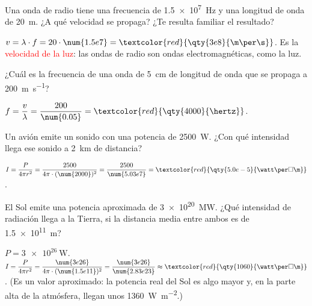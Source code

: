 \begin{exercise}
    Una onda de radio tiene una frecuencia de \qty{1.5e7}{\hertz} y una longitud de onda de \qty{20}{\m}. ¿A qué velocidad se propaga? ¿Te resulta familiar el resultado?
    \begin{solu}
        \(v = \lambda \cdot f = 20 \cdot \num{1.5e7} = \textcolor{red}{\qty{3e8}{\m\per\s}}\). Es la \textcolor{red}{velocidad de la luz}: las ondas de radio son ondas electromagnéticas, como la luz.
    \end{solu}
\end{exercise}

\begin{exercise}
    ¿Cuál es la frecuencia de una onda de \qty{5}{\cm} de longitud de onda que se propaga a \qty{200}{\m\per\s}?
    \begin{solu}
        \(f = \dfrac{v}{\lambda} = \dfrac{200}{\num{0.05}} = \textcolor{red}{\qty{4000}{\hertz}}\).
    \end{solu}
\end{exercise}

\begin{exercise}
    Un avión emite un sonido con una potencia de \qty{2500}{\watt}. ¿Con qué intensidad llega ese sonido a \qty{2}{\km} de distancia?
    \begin{solu}
        \(I = \dfrac{P}{4\pi r^2} = \dfrac{2500}{4\pi \cdot (\num{2000})^2} = \dfrac{2500}{\num{5.03e7}} = \textcolor{red}{\qty{5.0e-5}{\watt\per\square\m}}\).
    \end{solu}
\end{exercise}

\begin{exercise}
    El Sol emite una potencia aproximada de \qty{3e20}{\mega\watt}. ¿Qué intensidad de radiación llega a la Tierra, si la distancia media entre ambos es de \qty{1.5e11}{\m}?
    \begin{solu}
        \(P = \qty{3e26}{\watt}\). \(I = \dfrac{P}{4\pi r^2} = \dfrac{\num{3e26}}{4\pi \cdot (\num{1.5e11})^2} = \dfrac{\num{3e26}}{\num{2.83e23}} \approx \textcolor{red}{\qty{1060}{\watt\per\square\m}}\). (Es un valor aproximado: la potencia real del Sol es algo mayor y, en la parte alta de la atmósfera, llegan unos \qty{1360}{\watt\per\square\m}.)
    \end{solu}
\end{exercise}

